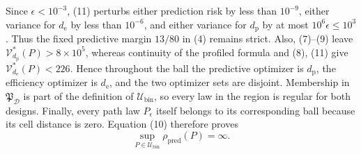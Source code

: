 Since \(\epsilon<10^{-3}\), (11) perturbs either prediction risk by less than \(10^{-9}\), either variance for \(d_{\mathrm e}\) by less than \(10^{-6}\), and either variance for \(d_{\mathrm p}\) by at most \(10^6\epsilon\le10^3\).  Thus the fixed predictive margin \(13/80\) in (4) remains strict.  Also, (7)--(9) leave \(\mathcal V_{d_{\mathrm p}}^*(P)>8\times10^5\), whereas continuity of the profiled formula and (8), (11) give \(\mathcal V_{d_{\mathrm e}}^*(P)<226\).  Hence throughout the ball the predictive optimizer is \(d_{\mathrm p}\), the efficiency optimizer is \(d_{\mathrm e}\), and the two optimizer sets are disjoint.  Membership in \(\mathfrak P_{\mathcal D}\) is part of the definition of \(\mathcal U_{\mathrm{bin}}\), so every law in the region is regular for both designs.  Finally, every path law \(P_{\epsilon}\) itself belongs to its corresponding ball because its cell distance is zero.  Equation (10) therefore proves
\[
 \sup_{P\in\mathcal U_{\mathrm{bin}}}\rho_{\mathrm{pred}}(P)=\infty.
\]